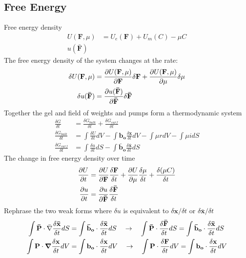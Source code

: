 \documentclass[12pt,3p]{article}
\numberwithin{equation}{section}
\begin{document}
\subsection{Free Energy}
Free energy density
\begin{align*}
U (\mathbf{F}, \mu) &= U_e (\mathbf{F}) + U_m (C) - \mu C \\
u (\mathbf{\bar{F}}) 
\end{align*}
The free energy density of the system changes at the rate: 
\begin{align*}
\delta U (\mathbf{F}, \mu) &= \pdv{U (\mathbf{F}, \mu)}{\mathbf{F}} \delta \mathbf{F}+ \pdv{U (\mathbf{F}, \mu)}{\mu} \delta \mu \\
\delta u (\mathbf{\bar{F}}) &=  \pdv{u (\mathbf{\bar{F}})}{\mathbf{\bar{F}}} \delta \mathbf{\bar{F}}
\end{align*}
Together the gel and field of weights and pumps form a thermodynamic system
\begin{align*}
\frac{\delta G}{\delta t} &= \frac{\delta G_{bulk}}{\delta t} + \frac{\delta G_{surf}}{\delta t} \\
 \frac{\delta G_{bulk}}{\delta t} &= \int \frac{\delta U}{\delta t} dV  - \int \mathbf{b_o} \frac{\delta \mathbf{x}}{\delta t} dV - \int \mu r dV - \int \mu i dS \\
\frac{\delta G_{surf}}{\delta t} &= \int \frac{\delta u}{\delta t} dS - \int \mathbf{\bar{b}_o} \frac{\delta \mathbf{\bar{x}}}{\delta t} dS 
\end{align*}
The change in free energy density over time 
\begin{align*}
\pdv{U}{t} &= \pdv{U}{\mathbf{F}} \frac{\delta \mathbf{F}}{\delta t}+ \pdv{U}{\mu} \frac{\delta \mu}{\delta t} + \frac{\delta (\mu C)}{\delta t} \\
\pdv{u}{t} &= \pdv{u}{\mathbf{\bar{F}}} \frac{\delta \mathbf{\bar{F}}}{\delta t}
\end{align*}
Rephrase the two weak forms where $\delta u$ is equivalent to $\delta \mathbf{x} / \delta t$ or $\delta \mathbf{\bar{x}} / \delta t $
\begin{align*}
\int \mathbf{\bar{P}} \cdot \bar{\nabla} \frac{\delta \mathbf{\bar{x}}}{\delta t} dS  &= \int \mathbf{\bar{b}_o} \cdot \frac{\delta \mathbf{\bar{x}}}{\delta t} dS 
\quad \rightarrow \quad 
\int \mathbf{\bar{P}} \cdot \frac{\delta \mathbf{\bar{F}}}{\delta t} dS = \int \mathbf{\bar{b}_o} \cdot \frac{\delta \mathbf{\bar{x}}}{\delta t} dS \\
\int \mathbf{P} \cdot \grad \frac{\delta \mathbf{x}}{\delta t} dV &= \int \mathbf{b_o} \cdot \frac{\delta \mathbf{x}}{\delta t} dV 
\quad \rightarrow \quad 
\int \mathbf{P} \cdot \frac{\delta \mathbf{F}}{\delta t} dV = \int \mathbf{b_o} \cdot \frac{\delta \mathbf{x}}{\delta t} dV
\end{align*}
\end{document}
